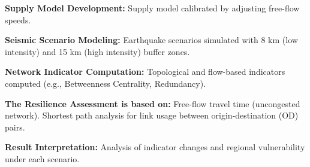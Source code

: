 \textbf{Supply Model Development:}  
\justify Supply model calibrated by adjusting free-flow speeds.

\textbf{Seismic Scenario Modeling:}  
\justify Earthquake scenarios simulated with 8 km (low intensity) and 15 km (high intensity) buffer zones.

\textbf{Network Indicator Computation:}  
\justify Topological and flow-based indicators computed (e.g., Betweenness Centrality, Redundancy).

\textbf{The Resilience Assessment is based on:}  
\justify Free-flow travel time (uncongested network).  
\justify Shortest path analysis for link usage between origin-destination (OD) pairs.

\textbf{Result Interpretation:}  
\justify Analysis of indicator changes and regional vulnerability under each scenario.